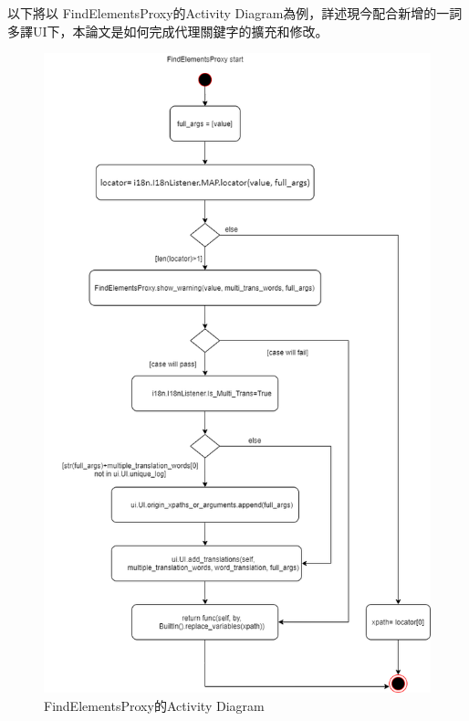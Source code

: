 以下將以 FindElementsProxy的Activity Diagram為例，詳述現今配合新增的一詞多譯UI下，本論文是如何完成代理關鍵字的擴充和修改。

\begin{figure}[H]
    \includegraphics[width= .85\textwidth]{../UML/i18n activity diagram-FindElementsProxy.png}
    \caption{FindElementsProxy的Activity Diagram}
\end{figure}

